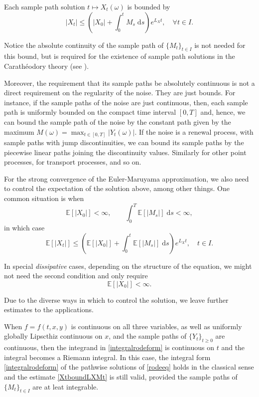 \documentclass[reqno,12pt]{amsart}
\theoremstyle{plain}%
\theoremstyle{definition}
\begin{document}
Each sample path solution $t \mapsto X_t(\omega)$ is bounded by
\begin{equation}
    \label{XtboundLXMt}
    |X_t| \leq \left(|X_0| + \int_0^t M_s\;\mathrm{d}s\right) e^{L_X t}, \quad \forall t\in I.
\end{equation}

Notice the absolute continuity of the sample path of $\{M_t\}_{t\in I}$ is not needed for this bound, but is required for the existence of sample path solutions in the Carath\'eodory theory (see \cite[Theorem 2.3]{HanKloeden2017}).

Moreover, the requirement that its sample paths be absolutely continuous is not a direct requirement on the regularity of the noise. They are just bounds. For instance, if the sample paths of the noise are just continuous, then, each sample path is uniformly bounded on the compact time interval $[0, T]$ and, hence, we can bound the sample path of the noise by the constant path given by the maximum $M(\omega) = \max_{t\in [0, T]}|Y_t(\omega)|$. If the noise is a renewal process, with sample paths with jump discontinuities, we can bound its sample paths by the piecewise linear paths joining the discontinuity values. Similarly for other point processes, for transport processes, and so on.

For the strong convergence of the Euler-Maruyama approximation, we also need to control the expectation of the solution above, among other things. One common situation is when
\[
    \mathbb{E}[|X_0|] < \infty, \qquad \int_0^T \mathbb{E}[|M_s|] \;\mathrm{d}s < \infty,
\]
in which case
\[
    \mathbb{E}[|X_t|] \leq \left(\mathbb{E}[|X_0|] + \int_0^t \mathbb{E}[|M_s|]\;\mathrm{d}s\right) e^{L_X t}, \quad t\in I.
\]

In special \emph{dissipative} cases, depending on the structure of the equation, we might not need the second condition and only require
\[
    \mathbb{E}[|X_0|] < \infty.
\]

Due to the diverse ways in which to control the solution, we leave further estimates to the applications.

When $f=f(t, x, y)$ is continuous on all three variables, as well as uniformly globally Lipscthiz continuous on $x$, and the sample paths of $\{Y_t\}_{t\geq 0}$ are continuous, then the integrand in \eqref{integralrodeform} is continuous on $t$ and the integral becomes a Riemann integral. In this case, the integral form \eqref{integralrodeform} of the pathwise solutions of \eqref{rodeeq} holds in the classical sense and the estimate \eqref{XtboundLXMt} is still valid, provided the sample paths of $\{M_t\}_{t\in I}$ are at leat integrable.
\end{document}
